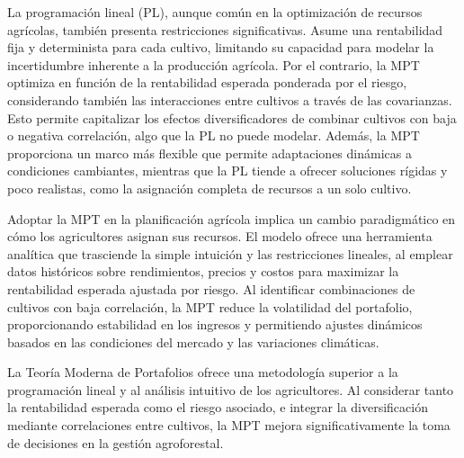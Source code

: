 \documentclass[
  letterpaper,
  DIV=11,
  numbers=noendperiod]{scrartcl}
\begin{document}
La programación lineal (PL), aunque común en la optimización de recursos
agrícolas, también presenta restricciones significativas. Asume una
rentabilidad fija y determinista para cada cultivo, limitando su
capacidad para modelar la incertidumbre inherente a la producción
agrícola. Por el contrario, la MPT optimiza en función de la
rentabilidad esperada ponderada por el riesgo, considerando también las
interacciones entre cultivos a través de las covarianzas. Esto permite
capitalizar los efectos diversificadores de combinar cultivos con baja o
negativa correlación, algo que la PL no puede modelar. Además, la MPT
proporciona un marco más flexible que permite adaptaciones dinámicas a
condiciones cambiantes, mientras que la PL tiende a ofrecer soluciones
rígidas y poco realistas, como la asignación completa de recursos a un
solo cultivo.

Adoptar la MPT en la planificación agrícola implica un cambio
paradigmático en cómo los agricultores asignan sus recursos. El modelo
ofrece una herramienta analítica que trasciende la simple intuición y
las restricciones lineales, al emplear datos históricos sobre
rendimientos, precios y costos para maximizar la rentabilidad esperada
ajustada por riesgo. Al identificar combinaciones de cultivos con baja
correlación, la MPT reduce la volatilidad del portafolio, proporcionando
estabilidad en los ingresos y permitiendo ajustes dinámicos basados en
las condiciones del mercado y las variaciones climáticas.

La Teoría Moderna de Portafolios ofrece una metodología superior a la
programación lineal y al análisis intuitivo de los agricultores. Al
considerar tanto la rentabilidad esperada como el riesgo asociado, e
integrar la diversificación mediante correlaciones entre cultivos, la
MPT mejora significativamente la toma de decisiones en la gestión
agroforestal.
\end{document}
